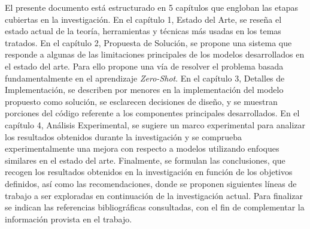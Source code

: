 El presente documento está estructurado en 5 capítulos que engloban las etapas cubiertas en la investigación. En el capítulo 1, Estado del Arte, se reseña el estado actual de la teoría, herramientas y técnicas más usadas en los temas tratados. En el capítulo 2, Propuesta de Solución, se propone una sistema que responde a algunas de las limitaciones principales de los modelos desarrollados en el estado del arte. Para ello propone una vía de resolver el problema basada fundamentalmente en el aprendizaje \textit{Zero-Shot}. En el capítulo 3, Detalles de Implementación, se describen por menores en la implementación del modelo propuesto como solución, se esclarecen decisiones de diseño, y se muestran porciones del código referente a los componentes principales desarrollados. En el capítulo 4, Análisis Experimental, se sugiere un marco experimental para analizar los resultados obtenidos durante la investigación y se comprueba experimentalmente una mejora con respecto a modelos utilizando enfoques similares en el estado del arte. Finalmente, se formulan las conclusiones, que recogen los resultados obtenidos en la investigación en función de los objetivos definidos, así como las recomendaciones, donde se proponen siguientes líneas de trabajo a ser exploradas en continuación de la investigación actual. Para finalizar se indican las referencias bibliográficas consultadas, con el fin de complementar la información provista en el trabajo.




